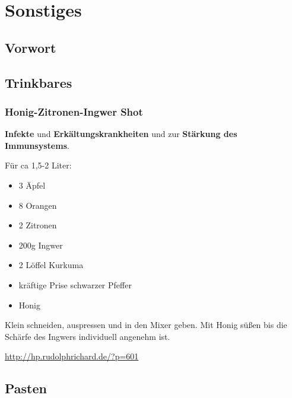 \chapter{Sonstiges}

\section{Vorwort}

\lipsum[1-5]
\newpage





\section{Trinkbares}


\subsection{Honig-Zitronen-Ingwer Shot}


\textbf{Infekte} und \textbf{Erkältungskrankheiten} und zur \textbf{Stärkung des Immunsystems}. 

  

Für ca 1,5-2 Liter:
\begin{itemize}
	\item 3 Äpfel
	\item 8 Orangen
	\item 2 Zitronen
	\item 200g Ingwer
	\item 2 Löffel Kurkuma
	\item kräftige Prise schwarzer Pfeffer
	\item Honig
\end{itemize}

Klein schneiden, auspressen und in den Mixer geben. Mit Honig süßen bis die Schärfe des Ingwers individuell angenehm ist.

\url{http://hp.rudolphrichard.de/?p=601}











\section{Pasten}

